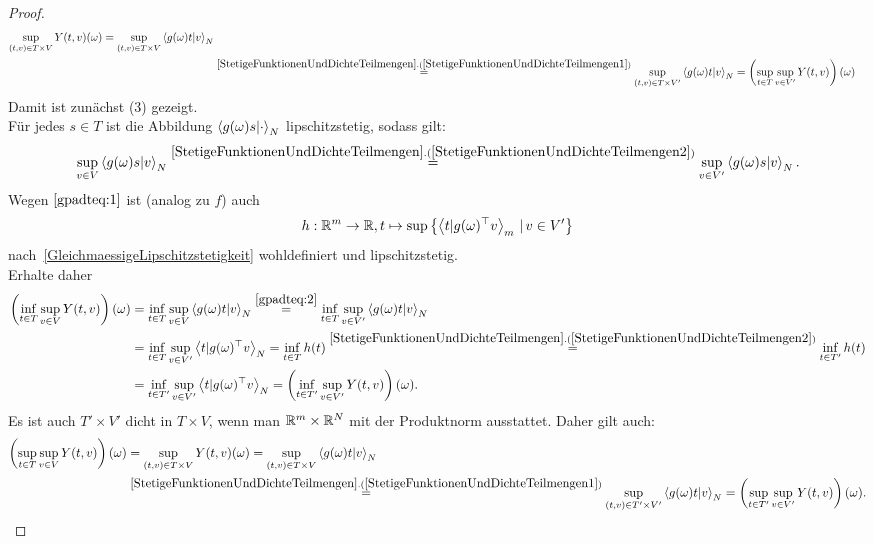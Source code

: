 \begin{proof}
\begin{align*}
\sup_{(t,v)\in T\times V} Y(t, v)(\omega) 
= \sup_{(t,v)\in T\times V} \sprod{g(\omega)t}v_N\\
&\overset{\refclaim{StetigeFunktionenUndDichteTeilmengen}
{StetigeFunktionenUndDichteTeilmengen1}}=
\sup_{(t, v) \in T \times V'}\sprod{g(\omega)t}v_N
= \left(\sup_{t \in T}\sup_{v \in V'}Y(t, v) \right)(\omega)
\end{align*}
Damit ist zunächst (3) gezeigt.\\
Für jedes $s \in T$ ist die Abbildung $\left\langle g(\omega)s |\cdot\right\rangle_N$
lipschitzstetig, sodass gilt:
\begin{align}
\sup_{v \in V}\sprod{g(\omega)s}v_N
\overset{\refclaim{StetigeFunktionenUndDichteTeilmengen}
{StetigeFunktionenUndDichteTeilmengen2}}= 
\sup_{v \in V'}\sprod{g(\omega)s}v_N\text. \label{gpadteq:2}
\end{align}
Wegen $\eqref{gpadteq:1}$ ist (analog zu $f$) auch 
\[h : \mathbb{R}^m \rightarrow \mathbb{R}, 
t \mapsto \sup\left\{\left\langle t |g(\omega)^\top v\right\rangle_m\,|\,v \in V'\right\}\]
nach~\ref{GleichmaessigeLipschitzstetigkeit} wohldefiniert und
lipschitzstetig.\\
Erhalte daher
\begin{align*}
\left(\inf_{t \in T}\sup_{v \in V}Y(t, v) \right)(\omega)&=
\inf_{t \in T} \sup_{v \in V}\sprod {g(\omega)t} v_N
\overset{\eqref{gpadteq:2}}=
\inf_{t \in T} \sup_{v \in V'}\sprod {g(\omega)t} v_N\\
&= \inf_{t \in T} \sup_{v \in V'}\sprod t {g(\omega)^\top v}_N
= \inf_{t \in T} h(t)\overset{\refclaim{StetigeFunktionenUndDichteTeilmengen}
{StetigeFunktionenUndDichteTeilmengen2} }= \inf_{t \in T'} h(t)\\
&= \inf_{t \in T'} \sup_{v \in V'}\sprod t {g(\omega)^\top v}_N
= \left(\inf_{t \in T'}\sup_{v \in V'}Y(t, v) \right)(\omega)\text.
\end{align*}
Es ist auch $T' \times V'$ dicht in $T \times V$, wenn man $\mathbb{R}^m \times \mathbb{R}^N$
mit der Produktnorm ausstattet. Daher gilt auch:
\begin{align*}
\left(\sup_{t \in T}\sup_{v \in V}Y(t, v) \right)(\omega) &=
\sup_{(t, v) \in T\times V}Y(t, v)(\omega) = 
\sup_{(t, v) \in T\times V}\sprod {g(\omega)t} v_N\\
&\overset{\refclaim{StetigeFunktionenUndDichteTeilmengen}
{StetigeFunktionenUndDichteTeilmengen1}}=
\sup_{(t, v) \in T'\times V'}\sprod {g(\omega)t} v_N
= \left(\sup_{t \in T'}\sup_{v \in V'}Y(t, v) \right)(\omega)\text.
\end{align*}
\end{proof}
